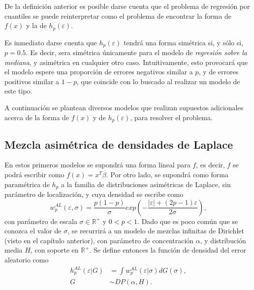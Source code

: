 De la definici\'on anterior es posible darse cuenta que el problema de regresi\'on por cuantiles se puede reinterpretar como el problema de encontrar la forma de $f(x)$ y la de $h_p(\varepsilon)$.

Es inmediato darse cuenta que $h_p(\varepsilon)$ tendr\'a una forma sim\'etrica si, y s\'olo si, $p = 0.5$. Es decir, sera sim\'etrica \'unicamente para el modelo de \textit{regresi\'on sobre la mediana}, y asim\'etrica en cualquier otro caso. Intuitivamente, esto provocar\'a que el modelo espere una proporci\'on de errores negativos similar a $p$, y de errores positivos similar a $1-p$, que coincide con lo buscado al realizar un modelo de este tipo.

A continuaci\'on se plantean diversos modelos que realizan supuestos adicionales acerca de la forma de $f(x)$ y de $h_p(\varepsilon)$, para resolver el problema.

\subsection{Mezcla asim\'etrica de densidades de Laplace}

En estos primeros modelos se supondr\'a una forma lineal para $f$, es decir, $f$ se podr\'a escribir como $f(x) = x^T \beta$. Por otro lado, se supondr\'a como forma param\'etrica de $h_p$ a la familia de distribuciones asim\'etricas de Laplace, sin par\'ametro de localizaci\'on, y cuya densidad se escribe como
\begin{equation*}
    w_p^{AL}(\varepsilon,\sigma) = 
    \frac{p(1-p)}{\sigma}
    exp \left(
    - \frac{|\varepsilon| + (2p - 1) \varepsilon}{2 \sigma}
    \right),
\end{equation*}
con par\'ametro de escala $\sigma \in \mathbb{R}^+$ y $0 < p <1$. Dado que es poco com\'un que se conozca el valor de $\sigma$, se recurrir\'a a un modelo de mezclas infinitas de Dirichlet (visto en el cap\'itulo anterior), con par\'ametro de concentraci\'on $\alpha$, y distribuci\'on media $H$, con soporte en $\mathbb{R}^+$. Se define entonces la funci\'on de densidad del error aleatorio como
\begin{equation*}
\begin{aligned}
    h_p^{AL}(\varepsilon|G) &= \int w_p^{AL}(\varepsilon|\sigma)dG(\sigma), \\
    G &\sim DP(\alpha,H).
\end{aligned}
\end{equation*}

